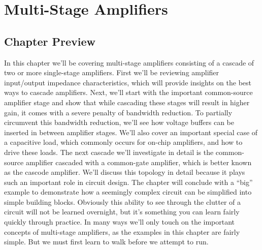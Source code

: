\chapter{Multi-Stage Amplifiers}
\graphicspath{{./figs_multistage/}}
\newcommand{\topicA}{Review Amplifier Input/Output Impedance Characteristics}
\newcommand{\topicB}{Common-Source Cascades}
\newcommand{\topicC}{Common-Source with Capacitive Load}
\newcommand{\topicD}{Common-Source Common-Gate Cascade (Cascode)}
\newcommand{\topicE}{``Big Circuit" Example}
\section{Chapter Preview}
In this chapter we'll be covering multi-stage amplifiers consisting of a cascade of two or more single-stage amplifiers.  First we'll be reviewing amplifier input/output impedance characteristics, which will provide insights on the best ways to cascade amplifiers.  Next, we'll start with the important common-source amplifier stage and show that while cascading these stages will result in higher gain, it comes with a severe penalty of bandwidth reduction.  To partially circumvent this bandwidth reduction, we'll see how voltage buffers can be inserted in between amplifier stages.  We'll also cover an important special case of a capacitive load, which commonly occurs for on-chip amplifiers, and how to drive these loads.  The next cascade we'll investigate in detail is the common-source amplifier cascaded with a common-gate amplifier, which is better known as the cascode amplifier.  We'll discuss this topology in detail because it plays such an important role in circuit design.  The chapter will conclude with a ``big'' example to demonstrate how a seemingly complex circuit can be simplified into simple building blocks.  Obviously this ability to see through the clutter of a circuit will not be learned overnight, but it's something you can learn fairly quickly through practice.  In many ways we'll only touch on the important concepts of multi-stage amplifiers, as the examples in this chapter are fairly simple.  But we must first learn to walk before we attempt to run.
